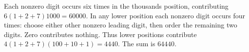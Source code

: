 Each nonzero digit occurs six times in the thousands position, contributing $ 6(1+2+7)1000=60000 $. In any lower position each nonzero digit occurs four times: choose either other nonzero leading digit, then order the remaining two digits. Zero contributes nothing. Thus lower positions contribute $ 4(1+2+7)(100+10+1)=4440 $. The sum is $\boxed{64440}$.
